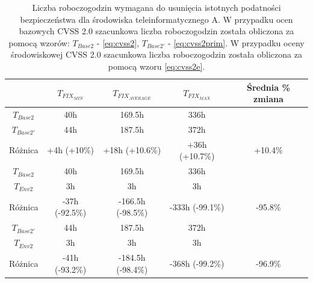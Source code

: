 \begin{table}[tbh]
\caption{Liczba roboczogodzin wymagana do usunięcia istotnych podatności bezpieczeństwa dla środowiska teleinformatycznego A. W przypadku ocen bazowych CVSS 2.0 szacunkowa liczba roboczogodzin została obliczona za pomocą wzorów: $T_{Base2}$ - \ref{eq:cvss2}, $T_{Base2'}$ - \ref{eq:cvss2prim}. W przypadku oceny środowiskowej CVSS 2.0 szacunkowa liczba roboczogodzin została obliczona za pomocą wzoru \ref{eq:cvss2e}.}
\begin{center}
\label{tab:chapter6:env_a:time_results_cvss2}
\begin{tabular}{c|ccc|c}
\hline
                & \textbf{$T_{FIX_{MIN}}$} & \textbf{$T_{FIX_{AVERAGE}}$} & \textbf{$T_{FIX_{MAX}}$ }  & Średnia \% zmiana \\
\hline
$T_{Base2}$      &                         40h &            169.5h &    336h         &        \\
$T_{Base2'}$     &                         44h &            187.5h &    372h         &         \\
Różnica          &               +4h (+10\%) &    +18h (+10.6\%) &  +36h (+10.7\%) & +10.4\%   \\  
\hline
$T_{Base2}$     &                          40h &            169.5h &    336h         &         \\
$T_{Env2}$        &                         3h &                3h &      3h         &         \\
Różnica          &              -37h (-92.5\%) & -166.5h (-98.5\%) & -333h (-99.1\%) & -95.8\% \\  
\hline
$T_{Base2'}$     &                         44h &            187.5h &    372h         &         \\
$T_{Env2}$        &                          3h &                3h &      3h        &         \\
Różnica          &              -41h (-93.2\%) & -184.5h (-98.4\%) & -368h (-99.2\%) & -96.9\% \\  
\hline
\end{tabular}
\end{center}
\end{table}

